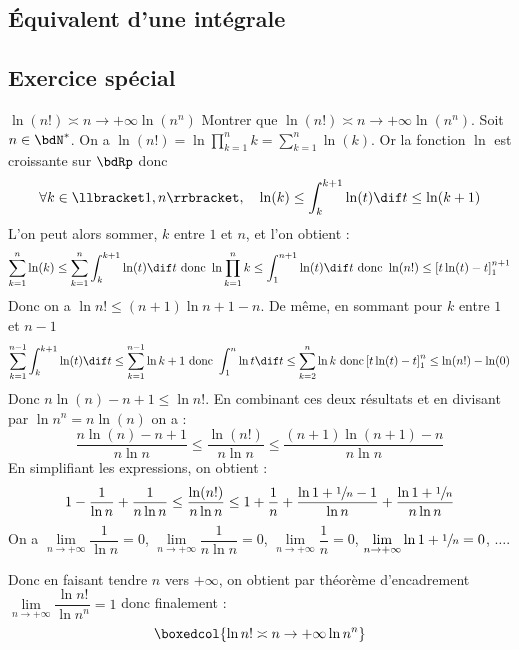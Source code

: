 \documentclass[a4paper,french,bookmarks]{article}
\begin{document}
\subsection{Équivalent d'une intégrale}

\subsection*{Exercice spécial}

\newpage
\begin{exercise}{$\ln(n!) \asymp{n \to +\infty} \ln(n^n)$}{}
    Montrer que $\ln(n!) \asymp{n \to +\infty} \ln(n^n)$.\tcblower
    Soit $n \in \bdN^*$. On a $\ln(n!) = \displaystyle \ln{\prod_{k=1}^n k} = \sum_{k=1}^n \ln(k)$. Or la fonction $\ln$ est croissante sur $\bdRp$ donc
    \[ \forall k \in \llbracket1, n\rrbracket, \quad \ln(k) \leq \int_k^{k+1} \ln(t)\dif t \leq \ln(k+1)\]
    L'on peut alors sommer, $k$ entre $1$ et $n$, et l'on obtient :
    \[ \sum_{k=1}^n \ln(k) \leq \sum_{k=1}^n \int_k^{k+1} \ln(t)\dif t \ \text{donc} \ \ln{\prod_{k=1}^n k} \leq \int_1^{n+1} \ln(t)\dif t \ \text{donc} \ \ln(n!) \leq \left[t\ln(t) - t\right]_1^{n+1}\]
    Donc on a $\ln{n!} \leq (n+1)\ln{n+1}-n$. De même, en sommant pour $k$ entre $1$ et $n-1$
    \[ \sum_{k=1}^{n-1} \int_k^{k+1} \ln(t)\dif t \leq \sum_{k=1}^{n-1} \ln{k+1} \ \text{donc} \ \int_1^n \ln{t}\dif t \leq \sum_{k=2}^n \ln{k}\ \text{donc} \left[t\ln(t)- t\right]_1^n \leq \ln(n!) - \ln(0)\]
    Donc $n\ln(n) - n + 1 \leq \ln{n!}$. En combinant ces deux résultats et en divisant par $\ln{n^n} = n\ln(n)$ on a :
    \[ \dfrac{n\ln(n)-n+1}{n\ln n} \leq \dfrac{\ln(n!)}{n\ln n} \leq \dfrac{(n+1)\ln(n+1)-n}{n\ln n}\]
    En simplifiant les expressions, on obtient :
    \[ 1 - \dfrac{1}{\ln n} + \dfrac{1}{n\ln n} \leq \dfrac{\ln(n!)}{n\ln n} \leq 1 + \dfrac{1}{n} + \dfrac{\ln{1+\sfrac{1}{n}}-1}{\ln n} + \dfrac{\ln{1+\sfrac{1}{n}}}{n\ln n}\]
    On a $\lim\limits_{n \to +\infty} \dfrac{1}{\ln n} = 0$, $\lim\limits_{n \to +\infty} \dfrac{1}{n\ln n} = 0$, $\lim\limits_{n \to +\infty} \dfrac{1}{n} = 0$, $\lim\limits_{n \to +\infty} \ln{1+\sfrac{1}{n}} = 0$, $\dots$.
    
    Donc en faisant tendre $n$ vers $+\infty$, on obtient par théorème d'encadrement $\lim\limits_{n \to +\infty}\dfrac{\ln{n!}}{\ln{n^n}} = 1$ donc finalement :
    \[ \boxedcol{\ln{n!} \asymp{n \to +\infty} \ln{n^n}}\]
\end{exercise}
\end{document}
